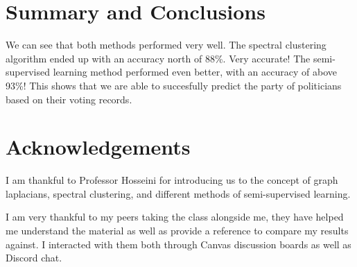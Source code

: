 \documentclass[11pt]{amsart}
\begin{document}
\section{Summary and Conclusions}\label{sec:conclusions}
We can see that both methods performed very well. The spectral clustering algorithm ended 
up with an accuracy north of 88\%. Very accurate! The semi-supervised learning method 
performed even better, with an accuracy of above 93\%! This shows that we are able to 
succesfully predict the party of politicians based on their voting records. 

\section*{Acknowledgements}
I am thankful to Professor Hosseini for introducing us to the concept of graph laplacians, spectral clustering, and different
methods of semi-supervised learning. 

I am very thankful to my peers taking the class alongside me, they have helped me understand the material as well
as provide a reference to compare my results against. I interacted with them both through Canvas discussion boards
as well as Discord chat. 




\cite{Hunter:2007}
\cite{harris2020array}
\cite{hosseini21_2022}
\cite{hosseini22_2022}
\cite{hosseini19_2022}
\cite{hosseini18_2022}
\cite{scikit-learn}
\end{document}

